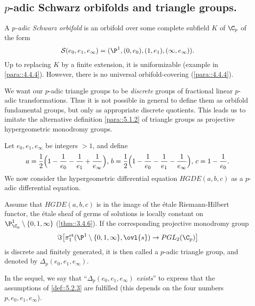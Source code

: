 \subsection{$p$-adic Schwarz orbifolds and triangle groups.}\label{sub::5.2}

\begin{para}\label{para::5.2.1} A {\it $p$-adic Schwarz orbifold} is an
 orbifold over some complete subfield $K$ of $\C_p$  of the form 
\begin{equation*}
\mathcal{S}(e_0,e_1,e_\infty)=(\P^1, (0, e_0), (1,e_1), (\infty, e_{\infty})).
\end{equation*}
\noindent Up to replacing $K$ by a finite extension, it is uniformizable
 (\cf example in \ref{para::4.4.4}). However, there is no universal
 orbifold-covering (\ref{para::4.4.4}).
 
We want our $p$-adic triangle groups to be {\it discrete}
groups of fractional linear $p$-adic transformations. Thus it is not
 possible in general to define them as orbifold 
fundamental groups, but only as appropriate discrete quotients. This
 leads us to imitate the alternative definition \ref{para::5.1.2} 
of triangle groups as projective hypergeometric monodromy groups. 
\end{para}

\begin{para}\label{para::5.2.2} Let $e_0, e_1, e_\infty$ be integers $>1$, and
 define  
\begin{equation*}
 a=
 \frac{1}{2}\Bigl(1-\frac{1}{e_0}-\frac{1}{e_1}+\frac{1}{e_{\infty}}\Bigr),\,
 b=
 \frac{1}{2}\Bigl(1-\frac{1}{e_0}-\frac{1}{e_1}-\frac{1}{e_{\infty}}\Bigr),\, 
 c= 1- \frac{1}{e_0}.
\end{equation*} 
 We now consider the hypergeometric differential equation 
$HGDE(a,b,c)$ as a $p$-adic differential equation.
\end{para}

\begin{dfn}\label{def::5.2.3} Assume that $ HGDE(a,b,c) $ is in the
 image of the \'etale Riemann-Hilbert functor, 
\ie the \'etale sheaf of germs
 of solutions is locally constant on $\P^1_{\C_p}\setminus\{0,1,\infty\}$
 (\cf \ref{thm::3.4.6}).  If the corresponding projective monodromy group
\begin{equation*}
\Im\bigl[\pi_1^{\mathrm{et}}(\P^1\setminus\{0,1,\infty\},\ovl{s})\to
 PGL_2(\C_p)\bigr]
\end{equation*} is discrete and finitely generated, it is then called
a {\rm $p$-adic triangle group}, and denoted by
$\Delta_p(e_0,e_1,e_\infty)$.

\medskip
In the sequel, we say that ``{\it $\Delta_p(e_0,e_1,e_\infty)$ exists}''
to express that the assumptions of \ref{def::5.2.3} are 
fulfilled (this depends on the four numbers $p,e_0,e_1,e_\infty$).

\end{dfn}

